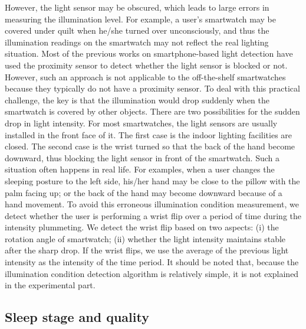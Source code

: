 However, the light sensor may be obscured, which leads to large errors in measuring the illumination level. For example, a user's
smartwatch may be covered under quilt when he/she turned over unconsciously, and thus the illumination readings on the smartwatch may not
reflect the real lighting situation. Most of the previous works on smartphone-based light detection have used the proximity sensor
to detect whether the light sensor is blocked or not. However, such an approach is not applicable to the off-the-shelf
smartwatches because they typically do not have a proximity sensor.  To deal with this practical challenge, the key is that the
illumination would drop suddenly when the smartwatch is covered by other objects. There are two possibilities for the sudden drop in light
intensity. For most smartwatches, the light sensors are usually installed in the front face of it. The first case is the indoor lighting
facilities are closed. The second case is the wrist turned so that the back of the hand become downward, thus blocking the light sensor in
front of the smartwatch. Such a situation often happens in real life. For examples, when a user changes the sleeping
posture to the left side, his/her hand may be close to the pillow with the palm facing up; or the back of the hand may become downward
because of a hand movement. To avoid this erroneous illumination condition measurement, we detect whether the user is performing a wrist
flip over a period of time during the intensity plummeting. We detect the wrist flip based on two aspects: (i) the rotation angle of
smartwatch; (ii) whether the light intensity maintains stable after the sharp drop. If the wrist flips, we use the average of the previous
light intensity as the intensity of the time period. It should be noted that, because the illumination condition detection algorithm is
relatively simple, it is not explained in the experimental part.

\subsection{Sleep stage and quality}

